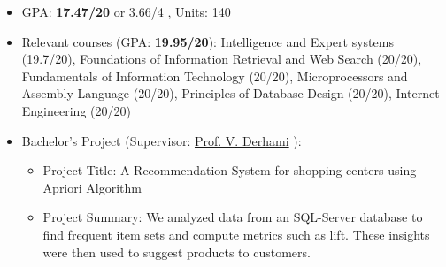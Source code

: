 \documentclass[letterpaper,11pt]{article}
\makeatletter
\newcommand{\resumeSubheading}[4]{
  \vspace{-2pt}\item
    \begin{tabular*}{1.0\textwidth}[t]{l@{\extracolsep{\fill}}r}
      \textbf{#1} & \textbf{\small #2} \\
    \textcolor{sgray} {\textit{\small#3}} & \textcolor{sgray}{ \textit{\small #4} }\\
    \end{tabular*}\vspace{-7pt}
}
\newcommand{\resumeSubHeadingListStart}{\begin{itemize}[leftmargin=0.0in, label={}]}
\newcommand{\resumeSubHeadingListEnd}{\end{itemize}}
\makeatother
\begin{document}
\begin{itemize}[itemsep=-3pt, parsep=5pt,label={$\diamond$}]

\item GPA: \textbf{17.47/20} or 3.66/4 , Units: 140


\item  Relevant courses (GPA: \textbf{19.95/20}):
Intelligence and Expert systems (19.7/20),
Foundations of Information Retrieval and Web Search (20/20),
Fundamentals of Information Technology (20/20),
Microprocessors and Assembly Language (20/20),
Principles of Database Design (20/20),
Internet Engineering (20/20)

\item Bachelor's Project (Supervisor: \hyperref[references]{Prof. V. Derhami} ):
\vspace*{-0.2cm}
\begin{itemize}[itemsep=-3pt, parsep=5pt]
\item Project Title: 
A Recommendation System for shopping centers using Apriori Algorithm

\item Project Summary: 
We analyzed data from an SQL-Server database to find frequent item sets and compute metrics such as lift. These insights were then used to suggest products to customers.
\end{itemize}



\end{itemize}  
  
\begin{comment}
\resumeSubHeadingListStart
    \resumeSubheading
      {Malek Sabet High School}{Sep 2012 - June. 2016}
      {Diploma in Physics and Mathematics Discipline}{Yazd, Iran}
  \resumeSubHeadingListEnd
 \small{ GPA: \textbf{19.49}/20, Units: 102, {\href{https://en.wikipedia.org/wiki/Governmental_leading_high_school}{ Affiliation: Governmental leading high school}}
\end{comment}  
\end{document}
